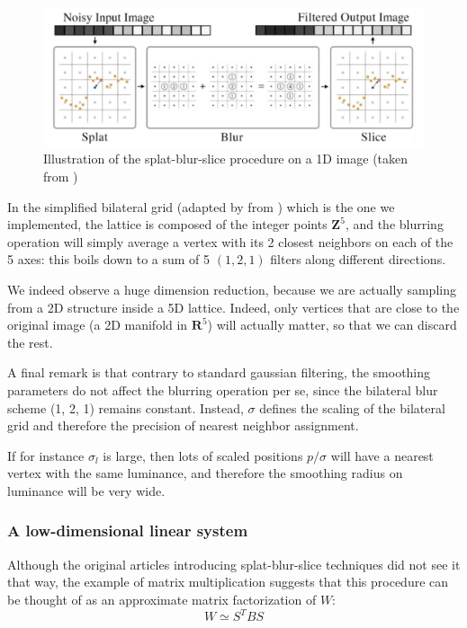 \documentclass{article}
\begin{document}
\begin{figure}
    \centering
    \includegraphics[width=\linewidth]{pictures/SBS.png}
    \caption{Illustration of the splat-blur-slice procedure on a 1D image (taken from \cite{barron_fast_2015})}
    \label{fig:SBS}
\end{figure}

\medskip

In the simplified bilateral grid (adapted by \cite{barron_fast_2015} from \cite{chen_real-time_2007}) which is the one we implemented, the lattice is composed of the integer points $\textbf{Z}^5$, and the blurring operation will simply average a vertex with its 2 closest neighbors on each of the 5 axes: this boils down to a sum of 5 $(1, 2, 1)$ filters along different directions.

We indeed observe a huge dimension reduction, because we are actually sampling from a 2D structure inside a 5D lattice. Indeed, only vertices that are close to the original image (a 2D manifold in $\textbf{R}^5$) will actually matter, so that we can discard the rest.

\medskip

A final remark is that contrary to standard gaussian filtering, the smoothing parameters do not affect the blurring operation per se, since the bilateral blur scheme (1, 2, 1) remains constant. Instead, $\sigma$ defines the scaling of the bilateral grid and therefore the precision of nearest neighbor assignment.

If for instance $\sigma_l$ is large, then lots of scaled positions $p / \sigma$ will have a nearest vertex with the same luminance, and therefore the smoothing radius on luminance will be very wide.

\subsubsection{A low-dimensional linear system}

Although the original articles introducing splat-blur-slice techniques did not see it that way, the example of matrix multiplication suggests that this procedure can be thought of as an approximate matrix factorization of $W$:
\begin{equation}
    W \simeq S^T B S
\end{equation}
\end{document}

